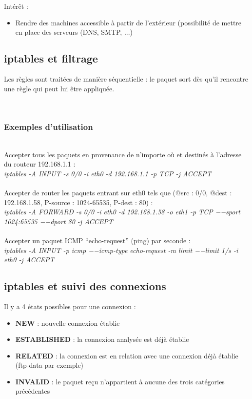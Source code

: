 \documentclass[journal, a4paper]{IEEEtran}
\begin{document}
Intérêt :
\begin{itemize}
	\item Rendre des machines accessible à partir de l’extérieur (possibilité de mettre en place des serveurs (DNS, SMTP, ...)
\end{itemize}

\subsection{iptables et filtrage}

Les règles sont traitées de manière séquentielle : le paquet sort dès qu'il rencontre une règle qui peut lui être appliquée.

~\\
\subsubsection{Exemples d'utilisation}
~\\
Accepter tous les paquets en provenance de n’importe où et destinés à l’adresse du routeur 192.168.1.1 :\\
\textit{iptables -A INPUT -s 0/0 -i eth0 -d 192.168.1.1 -p TCP -j ACCEPT}\\
~\\
Accepter de router les paquets entrant sur eth0 tels que (@src : 0/0, @dest : 192.168.1.58, P-source : 1024-65535, P-dest : 80) :\\
\textit{iptables -A FORWARD -s 0/0 -i eth0 -d 192.168.1.58 -o eth1 -p TCP −−sport 1024:65535 −−dport 80 -j ACCEPT}\\
~\\
Accepter un paquet ICMP “echo-request” (ping) par seconde :\\
\textit{iptables -A INPUT -p icmp −−icmp-type echo-request -m limit −−limit 1/s -i eth0 -j ACCEPT}

\subsection{iptables et suivi des connexions}

Il y a 4 états possibles  pour une connexion :
\begin{itemize}
	\item \textbf{NEW} : nouvelle connexion établie
	\item \textbf{ESTABLISHED} : la connexion analysée est déjà établie
	\item \textbf{RELATED} : la connexion est en relation avec une connexion  déjà établie (ftp-data par exemple)
	\item \textbf{INVALID} : le paquet reçu n'appartient à aucune des trois catégories précédentes
\end{itemize}
\end{document}
